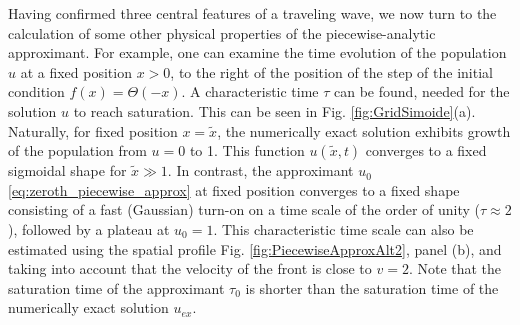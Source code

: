 \documentclass[amsmath,amssymb,amsfonts,aps,pre,preprint,superscriptaddress,showpacs,showkeys,longbibliography,nofootinbib]{revtex4-1}
\begin{document}
Having confirmed three central features of a traveling wave, we now turn to the calculation of some other physical properties of the piecewise-analytic approximant. For example, one can examine the time evolution of the population $u$ at a fixed position $x>0$, to the right of the position of the step of the initial condition $f(x) = \Theta(-x)$. A characteristic time $\tau$ can be found, needed for the solution $u$ to reach saturation. This can be seen in Fig. \ref{fig:GridSimoide}(a). Naturally, for fixed position $x=\tilde x$, the numerically exact solution exhibits growth of the population from $u=0$ to 1. This function $u(\tilde x,t)$ converges to a fixed sigmoidal shape for $\tilde x\gg 1$. In contrast, the approximant $u_0$ \eqref{eq:zeroth_piecewise_approx} at fixed position converges to a fixed shape consisting of a fast (Gaussian) turn-on on a time scale of the order of unity ($\tau \approx 2$), followed by a plateau at $u_0 =1$. This characteristic time scale can also be estimated using the spatial profile Fig. \ref{fig:PiecewiseApproxAlt2}, panel (b), and taking into account that the velocity of the front is close to $v=2$. Note that the saturation time of the approximant $\tau_0$ is shorter than the saturation time of the numerically exact solution $u_{ex}$. 
\end{document}
